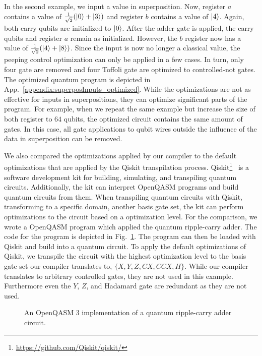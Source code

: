 In the second example, we input a value in superposition. Now, register $a$ contains a value of $\frac{1}{\sqrt{2}} (\ket{0} + \ket{3})$ and register $b$ contains a value of $\ket{4}$. Again, both carry qubits are initialized to $\ket{0}$. After the adder gate is applied, the carry qubits and register $a$ remain as initialized. However, the $b$ register now has a value of $\frac{1}{\sqrt{2}} (\ket{4} + \ket{8})$.
Since the input is now no longer a classical value, the peeping control optimization can only be applied in a few cases. In turn, only four gate are removed and four Toffoli gate are optimized to controlled-not gates.
The optimized quantum program is depicted in App.~\ref{appendix:superposInputs_optimized}. While the optimizations are not as effective for inputs in superpositions, they can optimize significant parts of the program. For example, when we repeat the same example but increase the size of both register to $64$ qubits, the optimized circuit contains the same amount of gates. In this case, all gate applications to qubit wires outside the influence of the data in superposition can be removed.

We also compared the optimizations applied by our compiler to the default optimizations that are applied by the Qiskit transpilation process. Qiskit\footnote{\url{https://github.com/Qiskit/qiskit/}}~\cite{JTK*24} is a software development kit for building, simulating, and transpiling quantum circuits. Additionally, the kit can interpret OpenQASM programs and build quantum circuits from them. When transpiling quantum circuits with Qiskit, \ie transforming to a specific domain, \eg another basis gate set, the kit can perform optimizations to the circuit based on a optimization level. For the comparison, we wrote a OpenQASM program which applied the quantum ripple-carry adder. The code for the program is depicted in Fig.~\ref*{fig:eval_adder_qasm}. The program can then be loaded with Qiskit and build into a quantum circuit. To apply the default optimizations of Qiskit, we transpile the circuit with the highest optimization level to the basis gate set our compiler translates to, \ie $\{X, Y, Z, CX, CCX, H\}$. While our compiler translates to arbitrary controlled gates, they are not used in this example. Furthermore even the $Y$, $Z$, and Hadamard gate are redundant as they are not used.

\begin{figure}[htp]
    \centering     
    
    \caption{An OpenQASM 3 implementation of a quantum ripple-carry adder circuit.}
    \label{fig:eval_adder_qasm}
\end{figure}

